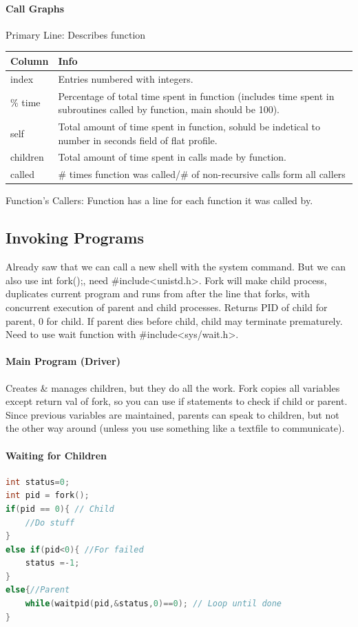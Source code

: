 \documentclass[12 pt]{article}
\begin{document}
\paragraph{Call Graphs}

Primary Line: Describes function
\begin{tabularx}{1.0\linewidth}{|X|X|}
  \hline \textbf{Column}&\textbf{Info}
  \\ \hline index & Entries numbered with integers.
  \\ \hline \% time & Percentage of total time spent in function (includes time spent in subroutines called by function, main should be 100).
  \\ \hline self & Total amount of time spent in function, sohuld be indetical to number in seconds field of flat profile.
  \\ \hline children & Total amount of time spent in calls made by function.
  \\ \hline called & \# times function was called/\# of non-recursive calls form all callers
  \\ \hline
\end{tabularx}
Function's Callers: Function has a line for each function it was called by.
\subsection{Invoking Programs}Already saw that we can call a new shell with the system command. But we can also use int fork();, need \#include<unistd.h>. Fork will make child process, duplicates current program and runs from after the line that forks, with concurrent execution of parent and child processes. Returns PID of child for parent, 0 for child. If parent dies before child, child may terminate prematurely. Need to use wait function with \#include<sys/wait.h>.
\paragraph{Main Program (Driver)} Creates \& manages children, but they do all the work. Fork copies all variables except return val of fork, so you can use if statements to check if child or parent. Since previous variables are maintained, parents can speak to children, but not the other way around (unless you use something like a textfile to communicate).
\paragraph{Waiting for Children}
\begin{lstlisting}[language=c]
int status=0;
int pid = fork();
if(pid == 0){ // Child
    //Do stuff
}
else if(pid<0){ //For failed
    status =-1;
}
else{//Parent
    while(waitpid(pid,&status,0)==0); // Loop until done
}
\end{lstlisting}
\end{document}

